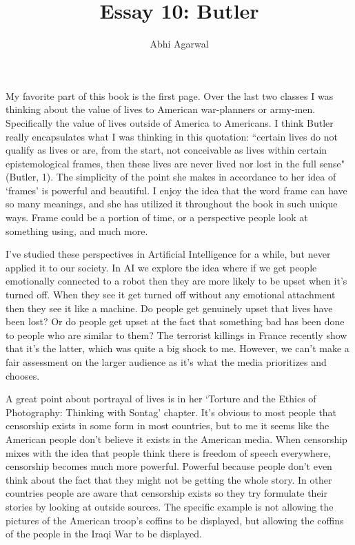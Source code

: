 \documentclass[11pt, oneside]{article}
\title{Essay 10: Butler}
\author{Abhi Agarwal}
\date{}
\begin{document}
\maketitle

\par My favorite part of this book is the first page. Over the last two classes I was thinking about the value of lives to American war-planners or army-men. Specifically the value of lives outside of America to Americans. I think Butler really encapsulates what I was thinking in this quotation: ``certain lives do not qualify as lives or are, from the start, not conceivable as lives within certain epistemological frames, then these lives are never lived nor lost in the full sense" (Butler, 1). The simplicity of the point she makes in accordance to her idea of `frames' is powerful and beautiful. I enjoy the idea that the word frame can have so many meanings, and she has utilized it throughout the book in such unique ways. Frame could be a portion of time, or a perspective people look at something using, and much more. 

\par I've studied these perspectives in Artificial Intelligence for a while, but never applied it to our society. In AI we explore the idea where if we get people emotionally connected to a robot then they are more likely to be upset when it's turned off. When they see it get turned off without any emotional attachment then they see it like a machine. Do people get genuinely upset that lives have been lost? Or do people get upset at the fact that something bad has been done to people who are similar to them? The terrorist killings in France recently show that it's the latter, which was quite a big shock to me. However, we can't make a fair assessment on the larger audience as it's what the media prioritizes and chooses. 

\par A great point about portrayal of lives is in her `Torture and the Ethics of Photography: Thinking with Sontag' chapter. It's obvious to most people that censorship exists in some form in most countries, but to me it seems like the American people don't believe it exists in the American media. When censorship mixes with the idea that people think there is freedom of speech everywhere, censorship becomes much more powerful. Powerful because people don't even think about the fact that they might not be getting the whole story. In other countries people are aware that censorship exists so they try formulate their stories by looking at outside sources. The specific example is not allowing the pictures of the American troop's coffins to be displayed, but allowing the coffins of the people in the Iraqi War to be displayed. 
\end{document}

